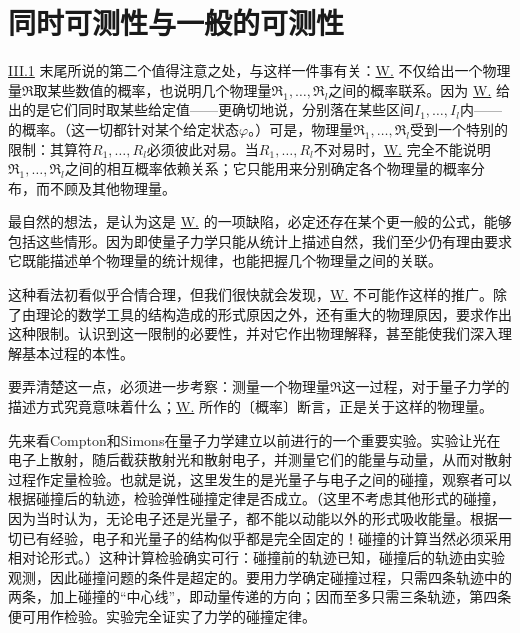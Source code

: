 \documentclass[fontsize=13pt,twoside,openany,headings=normal,parskip=false,bookmarkpackage=false,DIV=calc]{scrbook}
\begin{document}
\hypertarget{origpage-110}{}\label{origpage-110}\section{同时可测性与一般的可测性}\label{sec:III.3}
\hyperref[sec:III.1]{III.1} 末尾所说的第二个值得注意之处，与这样一件事有关：\hyperref[post:III.1.W]{W.} 不仅给出一个物理量$\mathfrak R$取某些数值的概率，也说明几个物理量$\mathfrak R_1,\allowbreak \ldots,\allowbreak \mathfrak R_l$之间的概率联系。因为 \hyperref[post:III.1.W]{W.} 给出的是它们同时取某些给定值——更确切地说，分别落在某些区间$I_1,\allowbreak \ldots,\allowbreak I_l$内——的概率。（这一切都针对某个给定状态$\varphi$。）可是，物理量$\mathfrak R_1,\allowbreak \ldots,\allowbreak \mathfrak R_l$受到一个特别的限制：其算符$R_1,\allowbreak \ldots,\allowbreak R_l$必须彼此对易。当$R_1,\allowbreak \ldots,\allowbreak R_l$不对易时，\hyperref[post:III.1.W]{W.} 完全不能说明$\mathfrak R_1,\allowbreak \ldots,\allowbreak \mathfrak R_l$之间的相互概率依赖关系；它只能用来分别确定各个物理量的概率分布，而不顾及其他物理量。

最自然的想法，是认为这是 \hyperref[post:III.1.W]{W.} 的一项缺陷，必定还存在某个更一般的公式，能够包括这些情形。因为即使量子力学只能从统计上描述自然，我们至少仍有理由要求它既能描述单个物理量的统计规律，也能把握几个物理量之间的关联。

这种看法初看似乎合情合理，但我们很快就会发现，\hyperref[post:III.1.W]{W.} 不可能作这样的推广。除了由理论的数学工具的结构造成的形式原因之外，还有重大的物理原因，要求作出这种限制。认识到这一限制的必要性，并对它作出物理解释，甚至能使我们深入理解基本过程的本性。

要弄清楚这一点，必须进一步考察：测量一个物理量$\mathfrak R$这一过程，对于量子力学的描述方式究竟意味着什么；\hyperref[post:III.1.W]{W.} 所作的〔概率〕断言，正是关于这样的物理量。

先来看Compton和Simons在量子力学建立以前进行的一个重要实验。实验让光在电子上散射，随后截获散射光和散射电子，并测量它们的能量与动量，从而对散射过程作定量检验。也就是说，这里发生的是光量子与电子之间的碰撞，\hypertarget{origpage-111}{}\label{origpage-111}观察者可以根据碰撞后的轨迹，检验弹性碰撞定律是否成立。（这里不考虑其他形式的碰撞，因为当时认为，无论电子还是光量子，都不能以动能以外的形式吸收能量。根据一切已有经验，电子和光量子的结构似乎都是完全固定的！碰撞的计算当然必须采用相对论形式。）这种计算检验确实可行：碰撞前的轨迹已知，碰撞后的轨迹由实验观测，因此碰撞问题的条件是超定的。要用力学确定碰撞过程，只需四条轨迹中的两条，加上碰撞的“中心线”，即动量传递的方向；因而至多只需三条轨迹，第四条便可用作检验。实验完全证实了力学的碰撞定律。
\end{document}
